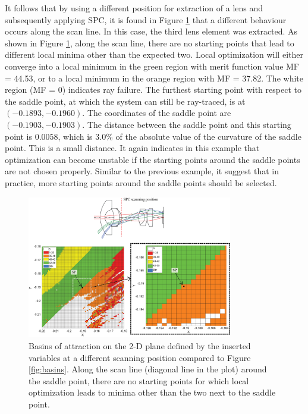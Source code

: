 It follows that by using a different position for extraction of a lens and subsequently applying SPC, it is found in Figure \ref{fig:basins_WAL_M3_S5} that a different behaviour occurs along the scan line. In this case, the third lens element was extracted. As shown in Figure \ref{fig:basins_WAL_M3_S5}, along the scan line, there are no starting points that lead to different local minima other than the expected two. Local optimization will either converge into a local minimum in the green region with merit function value MF = 44.53, or to a local minimum in the orange region with MF = 37.82. The white region (MF = 0) indicates ray failure. The furthest starting point with respect to the saddle point, at which the system can still be ray-traced, is at $(-0.1893, -0.1960)$. The coordinates of the saddle point are $(-0.1903, -0.1903)$. The distance between the saddle point and this starting point is $0.0058$, which is $3.0\%$ of the absolute value of the curvature of the saddle point. This is a small distance. It again indicates in this example that optimization can become unstable if the starting points around the saddle points are not chosen properly. Similar to the previous example, it suggest that in practice, more starting points around the saddle points should be selected. 
\begin{figure}[h!]
    \centering
    \includegraphics[width=0.8\textwidth]{chapter-4/figures/M3-S5_basins.png}
    \caption{Basins of attraction on the 2-D plane defined by the inserted variables at a different scanning position compared to Figure \ref{fig:basins}. Along the scan line (diagonal line in the plot) around the saddle point, there are no starting points for which local optimization leads to minima other than the two next to the saddle point.}
    \label{fig:basins_WAL_M3_S5}
\end{figure}
